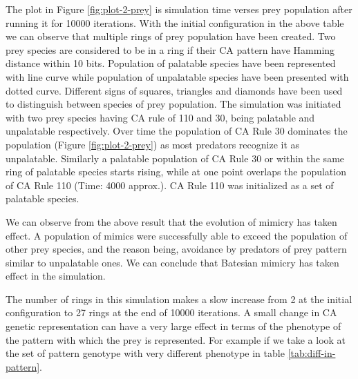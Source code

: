 \documentclass[letterpaper]{article}
\numberwithin{equation}{section}
\begin{document}
The plot in Figure \ref{fig:plot-2-prey} is simulation time verses prey population after running it for 10000 iterations. With the initial configuration in the above table we can observe that multiple rings of prey population have been created. Two prey species are considered to be in a ring if their CA pattern have Hamming distance within 10 bits. Population of palatable species have been represented with line curve while population of unpalatable species have been presented with dotted curve. Different signs of squares, triangles and diamonds have been used to distinguish between species of prey population. The simulation was initiated with two prey species having CA rule of 110 and 30, being palatable and unpalatable respectively. Over time the population of CA Rule 30 dominates the population (Figure \ref{fig:plot-2-prey}) as most predators recognize it as unpalatable. Similarly a palatable population of CA Rule 30 or within the same ring of palatable species starts rising, while at one point overlaps the population of CA Rule 110 (Time: 4000 approx.). CA Rule 110 was initialized as a set of palatable species.

We can observe from the above result that the evolution of mimicry has taken effect. A population of mimics were successfully able to exceed the population of other prey species, and the reason being, avoidance by predators of prey pattern similar to unpalatable ones. We can conclude that Batesian mimicry has taken effect in the simulation.

The number of rings in this simulation makes a slow increase from 2 at the initial configuration to 27 rings at the end of 10000 iterations. A small change in CA genetic representation can have a very large effect in terms of the phenotype of the pattern with which the prey is represented. For example if we take a look at the set of pattern genotype with very different phenotype in table \ref{tab:diff-in-pattern}.
\end{document}

